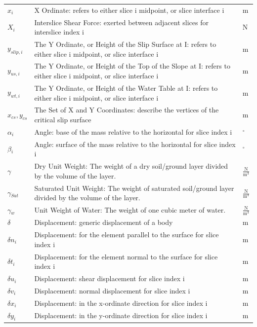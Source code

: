 \documentclass[12pt]{article}
\begin{document}
\begin{longtable*}{l l l}
$x_{i}$ & X Ordinate: refers to either slice i midpoint, or slice interface i & m
\\
$X_{i}$ & Interslice Shear Force: exerted between adjacent slices for interslice index i & N
\\
$y_{slip,i}$ & The Y Ordinate, or Height of the Slip Surface at I: refers to either slice i midpoint, or slice interface i & m
\\
$y_{us,i}$ & The Y Ordinate, or Height of the Top of the Slope at I: refers to either slice i midpoint, or slice interface i & m
\\
$y_{wt,i}$ & The Y Ordinate, or Height of the Water Table at I: refers to either slice i midpoint, or slice interface i & m
\\
${x_{cs},y_{cs}}$ & The Set of X and Y Coordinates: describe the vertices of the critical slip surface & m
\\
$\alpha{}_{i}$ & Angle: base of the mass relative to the horizontal for slice index i & ${}^{\circ}$
\\
$\beta{}_{i}$ & Angle: surface of the mass relative to the horizontal for slice index i & ${}^{\circ}$
\\
$\gamma{}$ & Dry Unit Weight: The weight of a dry soil/ground layer divided by the volume of the layer. & $\frac{\text{N}}{\text{m}^{3}}$
\\
$\gamma{}_{Sat}$ & Saturated Unit Weight: The weight of saturated soil/ground layer divided by the volume of the layer. & $\frac{\text{N}}{\text{m}^{3}}$
\\
$\gamma{}_{w}$ & Unit Weight of Water: The weight of one cubic meter of water. & $\frac{\text{N}}{\text{m}^{3}}$
\\
$\delta{}$ & Displacement: generic displacement of a body & m
\\
$\delta{}n_{i}$ & Displacement: for the element parallel to the surface for slice index i & m
\\
$\delta{}t_{i}$ & Displacement: for the element normal to the surface for slice index i & m
\\
$\delta{}u_{i}$ & Displacement: shear displacement for slice index i & m
\\
$\delta{}v_{i}$ & Displacement: normal displacement for slice index i & m
\\
$\delta{}x_{i}$ & Displacement: in the x-ordinate direction for slice index i & m
\\
$\delta{}y_{i}$ & Displacement: in the y-ordinate direction for slice index i & m
\\

\end{longtable*}
\end{document}
